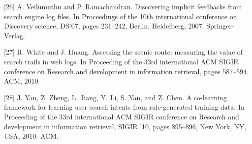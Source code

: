 \documentclass{acm_proc_article-sp} %
\begin{document}
[26] A. Veilumuthu and P. Ramachandran. Discovering
implicit feedbacks from search engine log files. In
Proceedings of the 10th international conference on
Discovery science, DS’07, pages 231–242, Berlin,
Heidelberg, 2007. Springer-Verlag.

[27] R. White and J. Huang. Assessing the scenic route:
measuring the value of search trails in web logs. In
Proceeding of the 33rd international ACM SIGIR
conference on Research and development in
information retrieval, pages 587–594. ACM, 2010.

[28] J. Yan, Z. Zheng, L. Jiang, Y. Li, S. Yan, and
Z. Chen. A co-learning framework for learning user
search intents from rule-generated training data. In
Proceeding of the 33rd international ACM SIGIR
conference on Research and development in
information retrieval, SIGIR ’10, pages 895–896, New
York, NY, USA, 2010. ACM.



\balancecolumns
\end{document}
